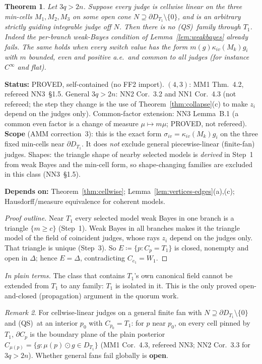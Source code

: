 \documentclass[11pt]{article}
\newtheorem{theorem}{Theorem}[section]
\theoremstyle{definition}
\theoremstyle{remark}
\newtheorem{remark}[theorem]{Remark}
\newcommand{\src}[1]{\textsf{#1}}
\newcommand{\status}[1]{\par\smallskip\noindent\textbf{Status:} #1\par}
\newcommand{\deps}[1]{\noindent\textbf{Depends on:} #1\par}
\newcommand{\inwords}[1]{\noindent\textit{In plain terms.} #1\par\smallskip}
\newcommand{\QS}{\textup{(QS)}}
\begin{document}
\begin{theorem}\label{thm:mincell}
Let $3q>2n$. Suppose every judge is cellwise linear on the three min-cells $M_1,M_2,M_3$ on some open cone $N\supseteq\partial D_{T_1}\setminus\{0\}$, and is an arbitrary strictly guiding integrable judge off $N$. Then there is no \QS\ family through $T_1$. Indeed the per-branch weak-Bayes condition of Lemma~\ref{lem:weakbayes} already fails. The same holds when every switch value has the form $m(g)\kappa_{iv}(M_k)g_i$ with $m$ bounded, even and positive a.e.\ and common to all judges (for instance $C^\infty$ and flat).
\end{theorem}
\status{PROVED, self-contained (no \src{FF2} import). $(4,3)$: \src{MM1} Thm.~4.2, refereed \src{NN3}~\S1.5. General $3q>2n$: \src{NN2} Cor.~3.2 and \src{NN1} Cor.~4.3 (not refereed; the step they change is the use of Theorem~\ref{thm:collapse}(c) to make $z_i$ depend on the judges only). Common-factor extension: \src{NN3} Lemma~B.1 (a common even factor is a change of measure $\mu\mapsto m\mu$; PROVED, not refereed). \textbf{Scope} (\src{AMM} correction~3): this is the exact form $\sigma_{iv}=\kappa_{iv}(M_k)g_i$ on the three fixed min-cells near $\partial D_{T_1}$. It does \emph{not} exclude general piecewise-linear (finite-fan) judges. Shapes: the triangle shape of nearby selected models is \emph{derived} in Step~1 from weak Bayes and the min-cell form, so shape-changing families are excluded in this class (\src{NN3}~\S1.5).}
\deps{Theorem~\ref{thm:cellwise}; Lemma~\ref{lem:vertices-edges}(a),(c); Hausdorff/measure equivalence for coherent models.}
\begin{proof}[Proof outline]
Near $T_1$ every selected model weak Bayes in one branch is a triangle $\{m\ge c\}$ (Step~1). Weak Bayes in all branches makes it the triangle model of the field of coincident judges, whose rays $z_i$ depend on the judges only. That triangle is unique (Step~3). So $E\coloneqq\{p:C_p=T_1\}$ is closed, nonempty and open in $\Delta$; hence $E=\Delta$, contradicting $C_{e_1}=W_1$.
\end{proof}
\inwords{The class that contains $T_1$'s own canonical field cannot be extended from $T_1$ to any family: $T_1$ is isolated in it. This is the only proved open-and-closed (propagation) argument in the quorum work.}

\begin{remark}\label{rem:fans}
For cellwise-linear judges on a general finite fan with $N\supseteq\partial D_{T_1}\setminus\{0\}$ and \QS\ at an interior $p_0$ with $C_{p_0}=T_1$: for $p$ near $p_0$, on every cell pinned by $T_1$, $\partial C_p$ is the boundary plane of the plain posterior $C_{\mu(p)}=\{g:\mu(p)\odot g\in D_{T_1}\}$ (\src{MM1} Cor.~4.3, refereed \src{NN3}; \src{NN2} Cor.~3.3 for $3q>2n$). Whether general fans fail globally is \textbf{open}.
\end{remark}
\end{document}
